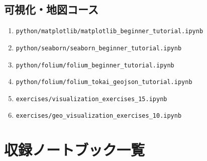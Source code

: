 \documentclass[a4paper,11pt]{ltjsarticle}
\newcommand{\filepath}[1]{\nolinkurl{#1}}
\begin{document}
\subsection{可視化・地図コース}

\begin{enumerate}
  \item \filepath{python/matplotlib/matplotlib_beginner_tutorial.ipynb}
  \item \filepath{python/seaborn/seaborn_beginner_tutorial.ipynb}
  \item \filepath{python/folium/folium_beginner_tutorial.ipynb}
  \item \filepath{python/folium/folium_tokai_geojson_tutorial.ipynb}
  \item \filepath{exercises/visualization_exercises_15.ipynb}
  \item \filepath{exercises/geo_visualization_exercises_10.ipynb}
\end{enumerate}

\section{収録ノートブック一覧}
\end{document}
